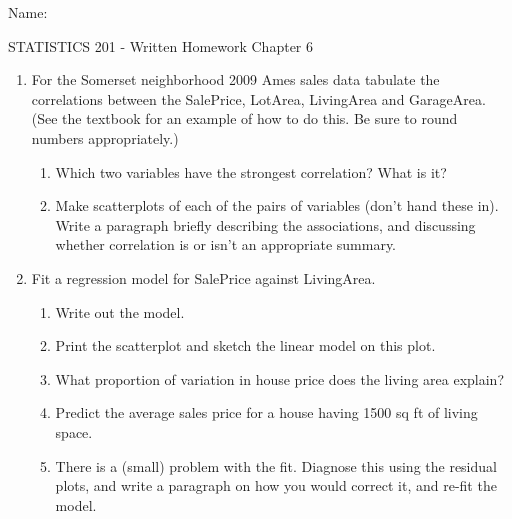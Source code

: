 \documentclass{article}
\begin{document}
\hspace{2in} Name: \underline{\mbox{\hspace{3.5in}}}\\

\begin{center}
{\large STATISTICS 201 - Written Homework Chapter 6}\\[3mm]
\end{center}

\begin{enumerate}
\item For the Somerset neighborhood 2009 Ames sales data tabulate the correlations between the SalePrice, LotArea, LivingArea and GarageArea. (See the textbook for an example of how to do this. Be sure to round numbers appropriately.)


\begin{enumerate}
\item Which two variables have the strongest correlation? What is it?


\item Make scatterplots of each of the pairs of variables (don't hand these in). Write a paragraph briefly describing the associations, and discussing whether correlation is  or isn't an appropriate summary.
\end{enumerate}

\item Fit a regression model for SalePrice against LivingArea. 

\begin{enumerate}
\item Write out the model. 
\item Print the scatterplot and sketch the linear model on this plot. 
\item What proportion of variation in house price does the living area explain?
\item
Predict the average sales price for a house having 1500 sq ft of living space.
\item There is a (small) problem with the fit. Diagnose this using the residual plots, and write a paragraph on how you would correct it, and re-fit the model. 
\end{enumerate}
\end{enumerate}
\end{document}
